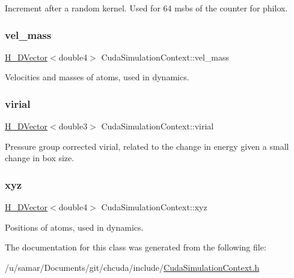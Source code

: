 Increment after a random kernel. Used for 64 msbs of the counter for philox. \hypertarget{classCudaSimulationContext_a447bdf19525da955f30804b68a80efcf}{}\label{classCudaSimulationContext_a447bdf19525da955f30804b68a80efcf} 
\subsubsection{\texorpdfstring{vel\+\_\+mass}{vel\_mass}}
{\footnotesize\ttfamily \hyperlink{structH__DVector}{H\+\_\+\+D\+Vector}$<$double4$>$ Cuda\+Simulation\+Context\+::vel\+\_\+mass}



Velocities and masses of atoms, used in dynamics. 

\hypertarget{classCudaSimulationContext_a1f7666b2858c9720c33f04c67cd81302}{}\label{classCudaSimulationContext_a1f7666b2858c9720c33f04c67cd81302} 
\subsubsection{\texorpdfstring{virial}{virial}}
{\footnotesize\ttfamily \hyperlink{structH__DVector}{H\+\_\+\+D\+Vector}$<$double3$>$ Cuda\+Simulation\+Context\+::virial}



Pressure group corrected virial, related to the change in energy given a small change in box size. 

\hypertarget{classCudaSimulationContext_af7492c16a26e127e9bc11d7e30d91ba7}{}\label{classCudaSimulationContext_af7492c16a26e127e9bc11d7e30d91ba7} 
\subsubsection{\texorpdfstring{xyz}{xyz}}
{\footnotesize\ttfamily \hyperlink{structH__DVector}{H\+\_\+\+D\+Vector}$<$double4$>$ Cuda\+Simulation\+Context\+::xyz}



Positions of atoms, used in dynamics. 



The documentation for this class was generated from the following file\+:\begin{DoxyCompactItemize}
\item 
/u/samar/\+Documents/git/chcuda/include/\hyperlink{CudaSimulationContext_8h}{Cuda\+Simulation\+Context.\+h}\end{DoxyCompactItemize}
